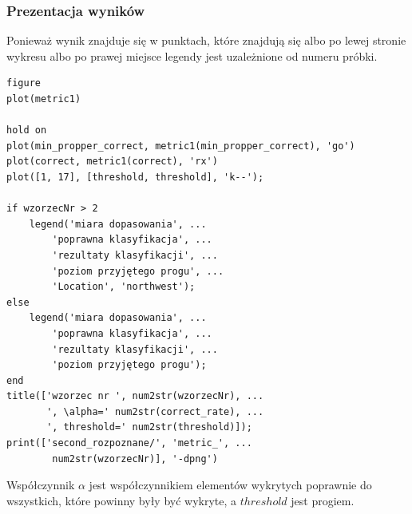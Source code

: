 \documentclass[a4paper, 12pt, titlepage]{article}
\begin{document}
            \subsubsection{Prezentacja wyników}
                Ponieważ wynik znajduje się w punktach, które znajdują się 
                albo po lewej stronie wykresu albo po prawej miejsce legendy
                jest uzależnione od numeru próbki.
\begin{lstlisting}
figure
plot(metric1)

hold on
plot(min_propper_correct, metric1(min_propper_correct), 'go')
plot(correct, metric1(correct), 'rx')
plot([1, 17], [threshold, threshold], 'k--');

if wzorzecNr > 2
    legend('miara dopasowania', ...
        'poprawna klasyfikacja', ...
        'rezultaty klasyfikacji', ...
        'poziom przyjętego progu', ...
        'Location', 'northwest');
else 
    legend('miara dopasowania', ...
        'poprawna klasyfikacja', ...
        'rezultaty klasyfikacji', ...
        'poziom przyjętego progu');
end
title(['wzorzec nr ', num2str(wzorzecNr), ...
       ', \alpha=' num2str(correct_rate), ...
       ', threshold=' num2str(threshold)]);
print(['second_rozpoznane/', 'metric_', ...
        num2str(wzorzecNr)], '-dpng')
\end{lstlisting}
            Współczynnik $\alpha$ jest współczynnikiem elementów wykrytych
            poprawnie do wszystkich, które powinny były być wykryte, a
            $threshold$ jest progiem.
\end{document}

